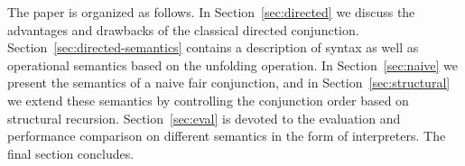 The paper is organized as follows. In Section~\ref{sec:directed} we discuss the advantages and drawbacks of the classical directed conjunction. Section~\ref{sec:directed-semantics} contains a
description of \mk syntax as well as operational semantics based on the unfolding operation. In Section~\ref{sec:naive} we present the semantics of a naive fair conjunction,
and in Section~\ref{sec:structural} we extend these semantics by controlling the conjunction order based on structural recursion. Section~\ref{sec:eval} is devoted to the evaluation
and performance comparison on different semantics in the form of interpreters. The final section concludes.
